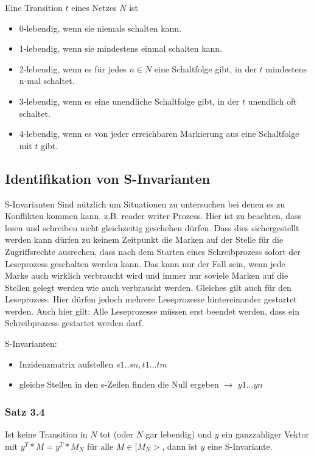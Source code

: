\documentclass[12pt]{scrreprt}
\begin{document}
Eine Transition $t$ eines Netzes $N$ ist
\begin{itemize}
	\item 0-lebendig, wenn sie niemals schalten kann.
	\item 1-lebendig, wenn sie mindestens einmal schalten kann.
	\item 2-lebendig, wenn es für jedes $n \in N$ eine Schaltfolge gibt, in der $t$ mindestens n-mal schaltet.
	\item 3-lebendig, wenn es eine unendliche Schaltfolge gibt, in der $t$ unendlich oft schaltet.
	\item 4-lebendig, wenn es von jeder erreichbaren Markierung aus eine Schaltfolge mit $t$ gibt.
\end{itemize}

\subsection{Identifikation von S-Invarianten}
S-Invarianten Sind nützlich um Situationen zu untersuchen bei denen es zu Konflikten kommen kann. z.B. reader writer Prozess. Hier ist zu beachten, dass lesen und schreiben nicht gleichzeitig geschehen dürfen. Dass dies sichergestellt werden kann dürfen zu keinem Zeitpunkt die Marken auf der Stelle für die Zugriffsrechte ausrechen, dass nach dem Starten eines Schreibprozess sofort der Leseprozess geschalten werden kann. Das kann nur der Fall sein, wenn jede Marke auch wirklich verbraucht wird und immer nur soviele Marken auf die Stellen gelegt werden wie auch verbraucht werden. Gleiches gilt auch für den Leseprozess. Hier dürfen jedoch mehrere Leseprozesse hintereinander gestartet werden. Auch hier gilt: Alle Leseprozesse müssen erst beendet werden, dass ein Schreibprozess gestartet werden darf.\newline

S-Invarianten:
\begin{itemize}
\item Inzidenzmatrix aufstellen $s1..sn, t1...tm$
\item gleiche Stellen in den s-Zeilen finden die Null ergeben $\rightarrow$ $y1...yn$
\end{itemize}

\subsubsection*{Satz 3.4}
Ist keine Transition in $N$ tot (oder $N$ gar lebendig) und $y$ ein ganzzahliger Vektor mit $y^{T} * M = y^{T} * M_{N}$ für alle $M \in [M_{N}>$, dann ist $y$ eine S-Invariante.\newline
\end{document}
